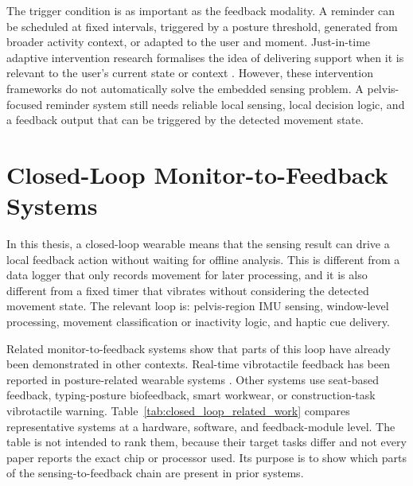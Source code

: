 The trigger condition is as important as the feedback modality. A reminder can be scheduled at fixed intervals, triggered by a posture threshold, generated from broader activity context, or adapted to the user and moment. Just-in-time adaptive intervention research formalises the idea of delivering support when it is relevant to the user's current state or context \cite{nahumshani2018jitai_design}. However, these intervention frameworks do not automatically solve the embedded sensing problem. A pelvis-focused reminder system still needs reliable local sensing, local decision logic, and a feedback output that can be triggered by the detected movement state.

\section{Closed-Loop Monitor-to-Feedback Systems}

In this thesis, a closed-loop wearable means that the sensing result can drive a local feedback action without waiting for offline analysis. This is different from a data logger that only records movement for later processing, and it is also different from a fixed timer that vibrates without considering the detected movement state. The relevant loop is: pelvis-region IMU sensing, window-level processing, movement classification or inactivity logic, and haptic cue delivery.

Related monitor-to-feedback systems show that parts of this loop have already been demonstrated in other contexts. Real-time vibrotactile feedback has been reported in posture-related wearable systems \cite{gopalai2011vibrotactile_posture_system}. Other systems use seat-based feedback, typing-posture biofeedback, smart workwear, or construction-task vibrotactile warning. Table~\ref{tab:closed_loop_related_work} compares representative systems at a hardware, software, and feedback-module level. The table is not intended to rank them, because their target tasks differ and not every paper reports the exact chip or processor used. Its purpose is to show which parts of the sensing-to-feedback chain are present in prior systems.

